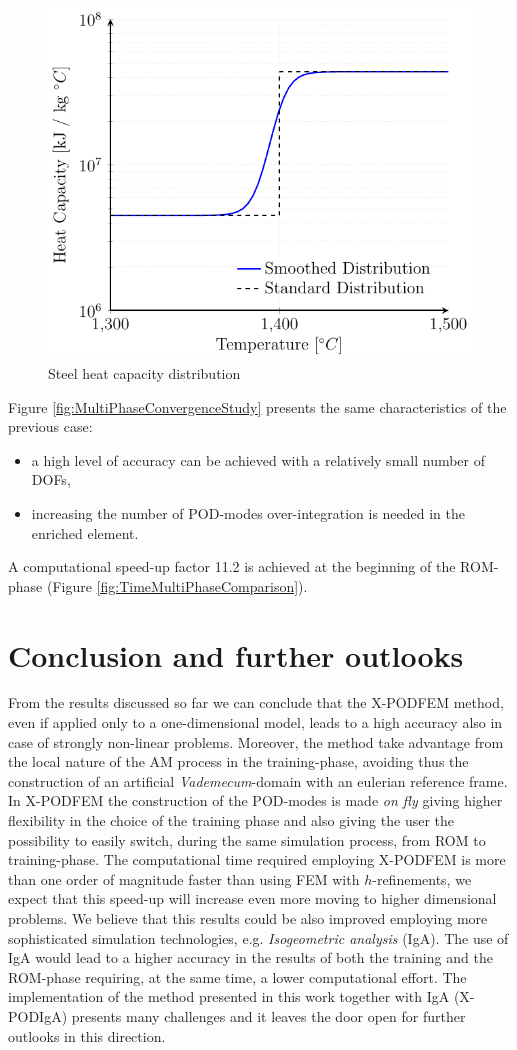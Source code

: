 \documentclass[3p]{article}
\begin{document}
\begin{figure}[!h]
\centering
  \includegraphics[width=0.5\linewidth]{Pictures/heatCapacity.pdf}
  \caption{Steel heat capacity distribution}
  \label{fig:heatCapacity}
\end{figure}

Figure \ref{fig:MultiPhaseConvergenceStudy} presents the same characteristics of the previous case: 
\begin{itemize}
\item a high level of accuracy can be achieved with a relatively small number of DOFs,
\item increasing the number of POD-modes over-integration is needed in the enriched element.
\end{itemize}
A computational speed-up factor 11.2 is achieved at the beginning of the ROM-phase (Figure \ref{fig:TimeMultiPhaseComparison}).


\section*{Conclusion and further outlooks}
From the results discussed so far we can conclude that the X-PODFEM method, even if applied only to a one-dimensional model, leads to a high accuracy also in case of strongly non-linear problems. Moreover, the method take advantage from the local nature of the AM process in the training-phase, avoiding thus the construction of an artificial \textit{Vademecum}-domain with an eulerian reference frame. In X-PODFEM the construction of the POD-modes is made \textit{on fly} giving higher flexibility in the choice of the training phase and also giving the user the possibility to easily switch, during the same simulation process, from ROM to training-phase.
The computational time required employing X-PODFEM is more than one order of magnitude faster than using FEM with $h$-refinements, we expect that this speed-up will increase even more moving to higher dimensional problems.
 We believe that this results could be also improved employing more sophisticated simulation technologies, e.g. \textit{Isogeometric analysis} (IgA). The use of IgA would lead to a higher accuracy in the results of both the training and the ROM-phase requiring, at the same time, a lower computational effort. The implementation of the method presented in this work together with IgA (X-PODIgA) presents many challenges and it leaves the door open for further outlooks in this direction.   



\end{document}
